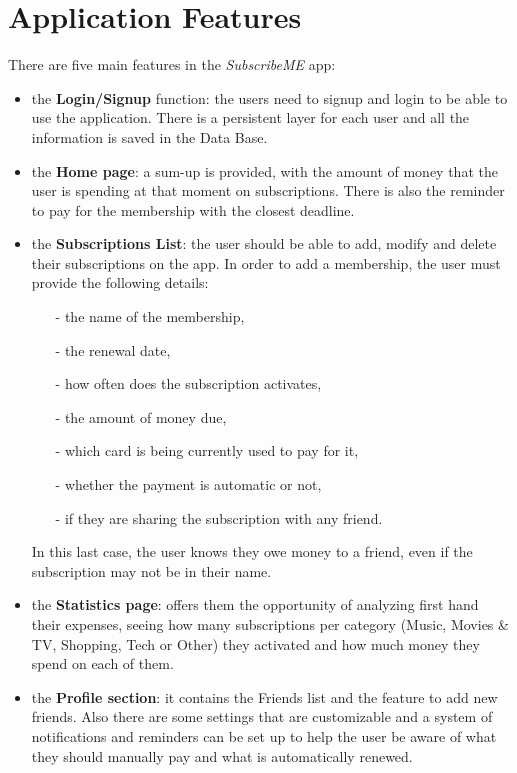 \documentclass[11pt]{article}
\begin{document}
\newpage
\section{Application Features}\label{sec:features}
There are five main features in the \textit{SubscribeME} app:
\begin{itemize}
    \item the \textbf{Login/Signup} function: the users need to signup and login to be able to use the application. There is a persistent layer for each user and all the information is saved in the Data Base.
    \item the \textbf{Home page}: a sum-up is provided, with the amount of money that the user is spending at that moment on subscriptions. There is also the reminder to pay for the membership with the closest deadline.
    \item the \textbf{Subscriptions List}: the user should be able to add, modify and delete their subscriptions on the app.
          In order to add a membership, the user must provide the following details:
          \begin{itemize}
              \item[-] the name of the membership,
              \item[-] the renewal date,
              \item[-] how often does the subscription activates,
              \item[-] the amount of money due,
              \item[-] which card is being currently used to pay for it,
              \item[-] whether the payment is automatic or not,
              \item[-] if they are sharing the subscription with any friend.
          \end{itemize}
          In this last case, the user knows they owe money to a friend, even if the subscription may not be in their name.
    \item the \textbf{Statistics page}: offers them the opportunity of analyzing first hand their expenses, seeing how many subscriptions per category (Music, Movies \& TV, Shopping, Tech or Other) they activated and how much money they spend on each of them.
    \item the \textbf{Profile section}: it contains the Friends list and the feature to add new friends. Also there are some settings that are customizable and a system of notifications and reminders can be set up to help the user be aware of what they should manually pay and what is automatically renewed.
\end{itemize}
\end{document}
